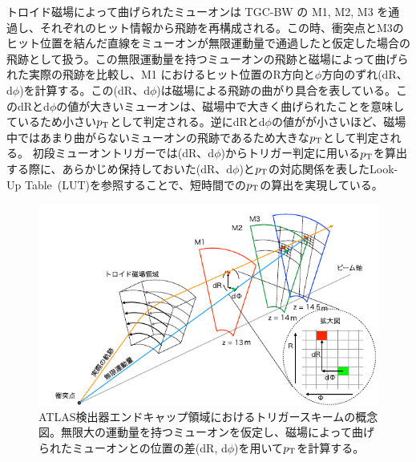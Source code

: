 トロイド磁場によって曲げられたミューオンは TGC-BW の M1, M2, M3 を通過し、それぞれのヒット情報から飛跡を再構成される。この時、衝突点とM3のヒット位置を結んだ直線をミューオンが無限運動量で通過したと仮定した場合の飛跡として扱う。この無限運動量を持つミューオンの飛跡と磁場によって曲げられた実際の飛跡を比較し、M1 におけるヒット位置のR方向と$\phi$方向のずれ(dR、d$\phi$)を計算する。この(dR、d$\phi$)は磁場による飛跡の曲がり具合を表している。このdRとd$\phi$の値が大きいミューオンは、磁場中で大きく曲げられたことを意味しているため小さい$p_{\rm{T}}$として判定される。逆にdRとd$\phi$の値がが小さいほど、磁場中ではあまり曲がらないミューオンの飛跡であるため大きな$p_{\rm{T}}$として判定される。
初段ミューオントリガーでは(dR、d$\phi$)からトリガー判定に用いる$p_{\rm{T}}$を算出する際に、あらかじめ保持しておいた(dR、d$\phi$)と$p_{\rm{T}}$の対応関係を表したLook-Up Table~(LUT)を参照することで、短時間での$p_{\rm{T}}$の算出を実現している。

\begin{figure}[tb]
  \centering
  \includegraphics[clip, width=15cm]{fig/3/akatuka_mt_trigger_sceme.pdf}
  \caption{ATLAS検出器エンドキャップ領域におけるトリガースキームの概念図\cite{article:akatsuka-mron}。無限大の運動量を持つミューオンを仮定し、磁場によって曲げられたミューオンとの位置の差(dR, d$\phi$)を用いて$p_{\rm{T}}$を計算する。}
  \label{fig:trigger-scheme}
\end{figure}


